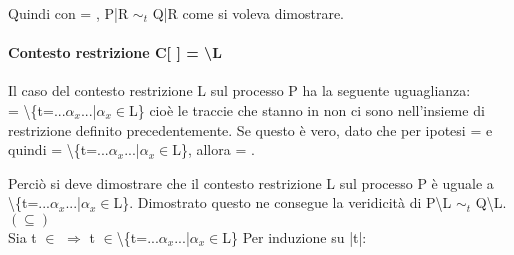 
Quindi con  = , P|R $\sim_{t}$ Q|R come si voleva dimostrare.

\paragraph{Contesto restrizione  C[ ] = \textbackslash L} \mbox{}

Il caso del contesto restrizione L sul processo P ha la seguente uguaglianza:\\  = \textbackslash\{t=...$\alpha_{x}$...|$\alpha_{x}\in$L\} cioè le traccie che stanno in  non ci sono nell'insieme di restrizione definito precedentemente. Se questo è vero, dato che per ipotesi  =  e quindi  = \textbackslash \{t=...$\alpha_{x}$...|$\alpha_{x}\in$L\}, allora  = . 

Perciò si deve dimostrare che il contesto restrizione L sul processo P è uguale a \\
\textbackslash \{t=...$\alpha_{x}$...|$\alpha_{x}\in$L\}. Dimostrato questo ne consegue la veridicità di P\textbackslash L $\sim_{t}$ Q\textbackslash L.\\

$(\subseteq)$ \\

Sia t $\in$  $\Rightarrow$  t $\in$\textbackslash\{t=...$\alpha_{x}$...|$\alpha_{x}\in$L\}
Per induzione su |t|:
\\

